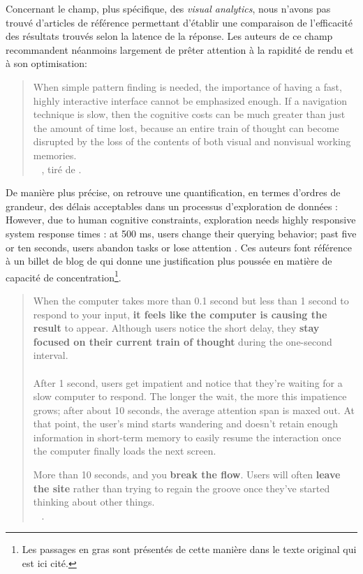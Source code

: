 Concernant le champ, plus spécifique, des \textit{visual analytics}, nous n'avons pas trouvé d'articles de référence permettant d'établir une comparaison de l'efficacité des résultats trouvés selon la latence de la réponse.
Les auteurs de ce champ recommandent néanmoins largement de prêter attention à la rapidité de rendu et à son optimisation:
\begin{quotation}
	\noindent \og
	When simple pattern finding is needed, the importance of having a fast, highly interactive interface cannot be emphasized	enough.
	If a navigation technique is slow, then the cognitive costs can be much greater than just the amount of time lost, because an entire train of thought can become disrupted by the loss of the contents of both visual and nonvisual working memories.
	\fg{}\\
	\mbox{}~ \hfill \cite{ware_information_2012}, tiré de \cite[12]{amirpour_amraii_human-data_2018}.
\end{quotation}

De manière plus précise, on retrouve une quantification, en termes d'ordres de grandeur, des délais acceptables dans un processus d'exploration de données : 
\og However, due to human cognitive constraints, exploration needs highly responsive system response times \textelp{}: at 500 ms, users change their querying behavior; past five or ten seconds, users abandon tasks or lose attention\fg{} \autocite[2]{fekete2019progressive}.
Ces auteurs font référence à un billet de blog de  qui donne une justification plus poussée en matière de capacité de concentration\footnote{
	Les passages en gras sont présentés de cette manière dans le texte original qui est ici cité.
}.
\begin{quotation}
	\noindent\og
	When the computer takes more than 0.1 second but less than 1 second to respond to your input, \textbf{it feels like the computer is causing the result} to appear.
	Although users notice the short delay, they \textbf{stay focused on their current train of thought} during the one-second interval.\\
	\textelp{}\\
	After 1 second, users get impatient and notice that they're waiting for a slow computer to respond.
	The longer the wait, the more this impatience grows; after about 10 seconds, the average attention span is maxed out.
	At that point, the user's mind starts wandering and doesn't retain enough information in short-term memory to easily resume the interaction once the computer finally loads the next screen.
	
	More than 10 seconds, and you \textbf{break the flow}. Users will often \textbf{leave the site} rather than trying to regain the groove once they've started thinking about other things.
	\fg{}\\
	\mbox{}~ \hfill \cite{nielsen_powers_2009}.
\end{quotation}


